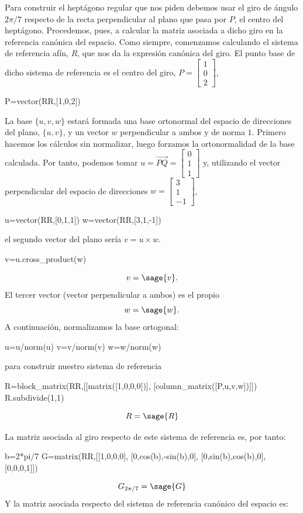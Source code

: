 \documentclass{amsart}
\begin{document}
Para construir el heptágono regular que nos piden debemos usar el giro de ángulo $2\pi/7$ respecto de la recta perpendicular al plano que pasa por $P$, el centro del heptágono. Procedemos, pues, a calcular la matriz asociada a dicho giro en la referencia canónica del espacio. Como siempre, comenzamos calculando el sistema de referencia afín, $R$, que nos da la expresión canónica del giro. El punto base de dicho sistema de referencia es el centro del giro, 
 $P = \left[\begin{array}{c}1\\0\\2
\end{array}\right]$,
\begin{sageblock}
P=vector(RR,[1,0,2])
\end{sageblock}
La base $\{u,v,w\}$ estará formada una base ortonormal del espacio de direcciones del plano, $\{u,v\}$, y un vector $w$ perpendicular a ambos y de norma $1$. Primero hacemos los cálculos sin normalizar, luego forzamos la ortonormalidad de la base calculada. Por tanto, podemos tomar  $u = \vec{PQ}=\left[\begin{array}{c}0\\1\\1
\end{array}\right]$ y, utilizando el vector perpendicular del espacio de direcciones $w = \left[\begin{array}{c}3\\1\\-1 \end{array}\right]$,
\begin{sageblock}
u=vector(RR,[0,1,1])
w=vector(RR,[3,1,-1])
\end{sageblock}
el segundo vector del plano sería $v=u\times w$.
\begin{sageblock}
v=u.cross_product(w)
\end{sageblock}
$$v=\sage{v}.$$ El tercer vector (vector perpendicular a ambos) es el propio $$w=\sage{w}.$$
A continuación, normalizamos la base ortogonal:
\begin{sageblock}
u=u/norm(u)
v=v/norm(v)
w=w/norm(w)
\end{sageblock}
para construir nuestro sistema de referencia
\begin{sageblock}
R=block_matrix(RR,[[matrix([1,0,0,0])],
                  [column_matrix([P,u,v,w])]])
R.subdivide(1,1)
\end{sageblock}
\[ R = \sage{R}\] 

La matriz asociada al giro respecto de este sistema de referencia es, por tanto:
\begin{sageblock}
b=2*pi/7
G=matrix(RR,[[1,0,0,0],
             [0,cos(b),-sin(b),0],
             [0,sin(b),cos(b),0],
             [0,0,0,1]])
\end{sageblock}
$$G_{2\pi/7}=\sage{G}$$
Y la matriz asociada respecto del sistema de referencia canónico del espacio es:
\end{document}
